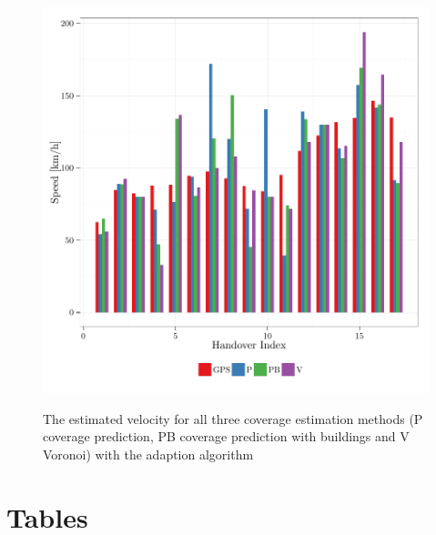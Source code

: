 \documentclass[twocolumn]{bmcart}%
\begin{document}
\begin{backmatter}
	\begin{figure}[h!]
		
		\caption{ The estimated velocity for all three coverage estimation methods (P coverage prediction, PB coverage prediction with buildings and V Voronoi) with the adaption algorithm
		}
		\includegraphics[width=0.9\columnwidth]{images/563_SpeedsWithAdaption}
		\label{fig:velocityadaption}
	\end{figure}
	
	\section*{Tables}
	

\end{backmatter}
\end{document}
